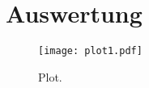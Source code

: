 \section{Auswertung}
\label{sec:Auswertung}

\begin{figure}
  \centering
  \texttt{[image: plot1.pdf]}
  \caption{Plot.}
  \label{fig:plot}
\end{figure}
